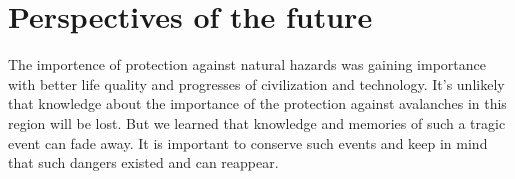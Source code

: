 \documentclass[12pt, a4paper]{article}
\begin{document}
\section*{Perspectives of the future}
The importence of protection against natural hazards was gaining importance with better life quality and progresses of 
civilization and technology. It's unlikely that knowledge about the importance of the protection against avalanches in this 
region will be lost. But we learned that knowledge and memories of such a tragic event can fade away. It is important to 
conserve such events and keep in mind that such dangers existed and can reappear.


\end{document}

